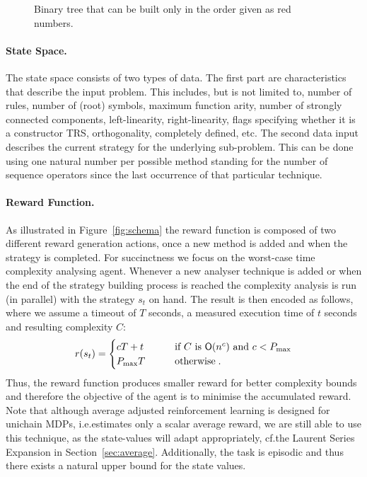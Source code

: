 \documentclass[envcountsame]{llncs}
\begin{document}
\begin{figure*}[t!]
  \centering
  \caption{\label{fig:binary}Binary tree that can be built only in the order given as red numbers.}
\end{figure*}

\paragraph{State Space.} The state space consists of two types of data. The first part are
characteristics that describe the input problem. This includes, but is not limited to, number of
rules, number of (root) symbols, maximum function arity, number of strongly connected components,
left-linearity, right-linearity, flags specifying whether it is a constructor TRS, orthogonality,
completely defined, etc. The second data input describes the current strategy for the underlying
sub-problem. This can be done using one natural number per possible method standing for the number
of sequence operators since the last occurrence of that particular technique.

\paragraph{Reward Function.} As illustrated in Figure~\ref{fig:schema} the reward function is
composed of two different reward generation actions, once a new method is added and when the
strategy is completed. %
For succinctness we focus on the worst-case time complexity analysing agent. Whenever a new analyser
technique is added or when the end of the strategy building process is reached the complexity
analysis is run (in parallel) with the strategy \(s_{t}\) on hand. The result is then encoded as
follows, where we assume a timeout of \(T\) seconds, a measured execution time of \(t\) seconds and
resulting complexity \(C\):
\begin{align*}
  r(s_{t}) =
  \begin{cases}
     c T + t    & \qquad   \text{if $C$ is }\bO(n^{c}) \text{ and } c < P_{\max}\\
     P_{\max} T  & \qquad  \text{otherwise}\tpkt
  \end{cases}
\end{align*}
Thus, the reward function produces smaller reward for better complexity bounds and therefore the
objective of the agent is to minimise the accumulated reward. Note that although average adjusted
reinforcement learning is designed for unichain MDPs, i.e.\@ estimates only a scalar average reward,
we are still able to use this technique, as the state-values will adapt appropriately, cf.\@ the
Laurent Series Expansion in Section~\ref{sec:average}. Additionally, the task is episodic and thus
there exists a natural upper bound for the state values.
\end{document}
